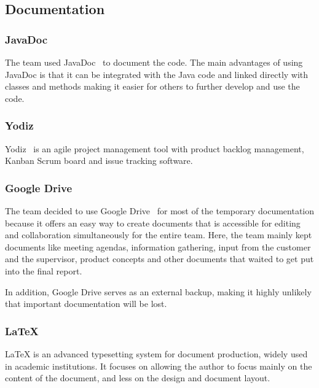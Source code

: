 \subsection{Documentation}

\subsubsection{JavaDoc}
The team used JavaDoc~\cite{javadoc} to document the code. The main advantages of using JavaDoc is that it can be integrated with the Java code and linked directly with classes and methods making it easier for others to further develop and use the code.

\subsubsection{Yodiz}
 Yodiz~\cite{yodiz} is an agile project management tool with product backlog management, Kanban Scrum board and issue tracking software.

\subsubsection{Google Drive}
The team decided to use Google Drive~\cite{gdrive} for most of the temporary documentation because it offers an easy way to create documents that is accessible for editing and collaboration simultaneously for the entire team. Here, the team mainly kept documents like meeting agendas, information gathering, input from the customer and the supervisor, product concepts and other documents that waited to get put into the final report. 

In addition, Google Drive serves as an external backup, making it highly unlikely that important documentation will be lost. 


\subsubsection{\LaTeX}
LaTeX is an advanced typesetting system for document production, widely used in
academic institutions. It focuses on allowing the author to focus mainly on the content of the document, and less on the design and document layout.

